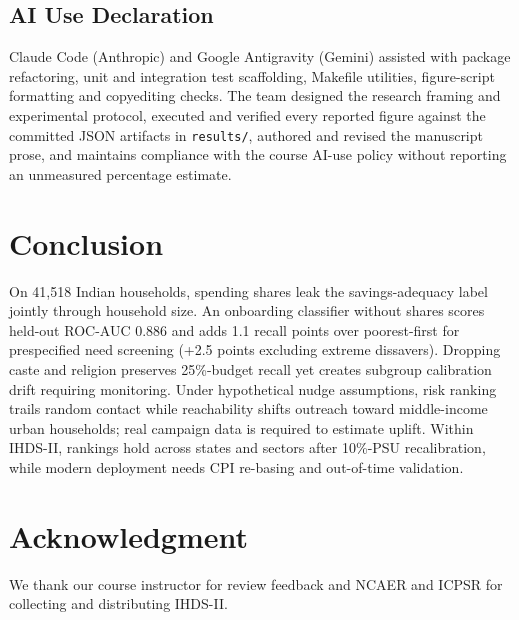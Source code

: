 \documentclass[conference]{IEEEtran}
\begin{document}
\subsection{AI Use Declaration}
\label{subsec:ai_use}

Claude Code (Anthropic) and Google Antigravity (Gemini) assisted with package refactoring, unit and integration test scaffolding, Makefile utilities, figure-script formatting and copyediting checks. The team designed the research framing and experimental protocol, executed and verified every reported figure against the committed JSON artifacts in \texttt{results/}, authored and revised the manuscript prose, and maintains compliance with the course AI-use policy without reporting an unmeasured percentage estimate.

\section{Conclusion}

On 41,518 Indian households, spending shares leak the savings-adequacy label jointly through household size. An onboarding classifier without shares scores held-out ROC-AUC 0.886 and adds 1.1 recall points over poorest-first for prespecified need screening (+2.5 points excluding extreme dissavers). Dropping caste and religion preserves 25\%-budget recall yet creates subgroup calibration drift requiring monitoring. Under hypothetical nudge assumptions, risk ranking trails random contact while reachability shifts outreach toward middle-income urban households; real campaign data is required to estimate uplift. Within IHDS-II, rankings hold across states and sectors after 10\%-PSU recalibration, while modern deployment needs CPI re-basing and out-of-time validation.

\section*{Acknowledgment}

We thank our course instructor for review feedback and NCAER and ICPSR for collecting and distributing IHDS-II.
\end{document}
